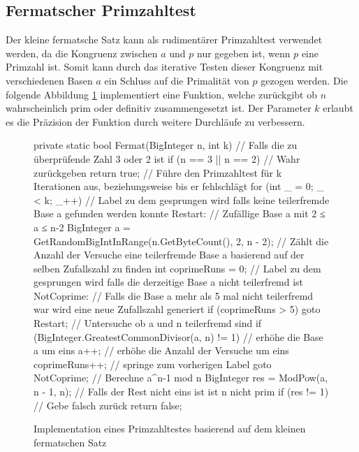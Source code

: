\subsection{Fermatscher Primzahltest}

Der kleine fermatsche Satz kann als rudimentärer Primzahltest verwendet werden, da die Kongruenz zwischen $a$ und $p$ nur gegeben ist, wenn $p$ eine Primzahl ist. Somit kann durch das iterative Testen dieser Kongruenz mit verschiedenen Basen $a$ ein Schluss auf die Primalität von $p$ gezogen werden. Die folgende Abbildung \ref{csharp:fermat} implementiert eine Funktion, welche zurückgibt ob $n$ wahrscheinlich prim oder definitiv zusammengesetzt ist. Der Parameter $k$ erlaubt es die Präzision der Funktion durch weitere Durchläufe zu verbessern.

\begin{figure}[htbp]
  \begin{xcminted}
  
  private static bool Fermat(BigInteger n, int k)
  {
    // Falls die zu überprüfende Zahl 3 oder 2 ist
    if (n == 3 || n == 2)
      // Wahr zurückgeben
      return true;
    // Führe den Primzahltest für k Iterationen aus, beziehungsweise bis er fehlschlägt
    for (int _ = 0; _ < k; _++)
    {
      // Label zu dem gesprungen wird falls keine teilerfremde Base a gefunden werden konnte
      Restart:
      // Zufällige Base a mit 2 ≤ a ≤ n-2
      BigInteger a = GetRandomBigIntInRange(n.GetByteCount(), 2, n - 2);
      // Zählt die Anzahl der Versuche eine teilerfremde Base a basierend auf der selben Zufallszahl zu finden
      int coprimeRuns = 0;
      // Label zu dem gesprungen wird falls die derzeitige Base a nicht teilerfremd ist
      NotCoprime:
      // Falls die Base a mehr als 5 mal nicht teilerfremd war wird eine neue Zufallszahl generiert
      if (coprimeRuns > 5)
        goto Restart;
      // Untersuche ob a und n teilerfremd sind
      if (BigInteger.GreatestCommonDivisor(a, n) != 1)
      {
        // erhöhe die Base a um eins
        a++;
        // erhöhe die Anzahl der Versuche um eins
        coprimeRuns++;
        // springe zum vorherigen Label
        goto NotCoprime;
      }
      // Berechne a^n-1 mod n
      BigInteger res = ModPow(a, n - 1, n);
      // Falls der Rest nicht eins ist ist n nicht prim
      if (res != 1)
      {
        // Gebe falsch zurück
        return false;
      }
    }
  }
  \end{xcminted}
  \caption{Implementation eines Primzahltestes basierend auf dem kleinen fermatschen Satz}
  \label{csharp:fermat}
\end{figure}
